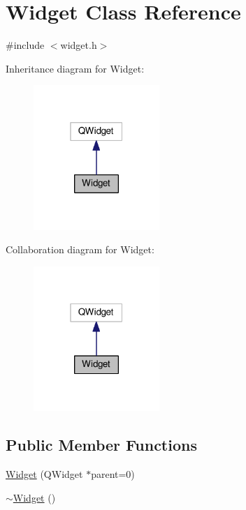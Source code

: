 \hypertarget{class_widget}{}\section{Widget Class Reference}
\label{class_widget}


{\ttfamily \#include $<$widget.\+h$>$}



Inheritance diagram for Widget\+:\nopagebreak
\begin{figure}[H]
\begin{center}
\leavevmode
\includegraphics[width=135pt]{class_widget__inherit__graph}
\end{center}
\end{figure}


Collaboration diagram for Widget\+:\nopagebreak
\begin{figure}[H]
\begin{center}
\leavevmode
\includegraphics[width=135pt]{class_widget__coll__graph}
\end{center}
\end{figure}
\subsection*{Public Member Functions}
\begin{DoxyCompactItemize}
\item 
\hyperlink{class_widget_a29531c7f141e461322981b3b579d4590}{Widget} (Q\+Widget $\ast$parent=0)
\item 
\hyperlink{class_widget_aa24f66bcbaaec6d458b0980e8c8eae65}{$\sim$\+Widget} ()
\end{DoxyCompactItemize}
